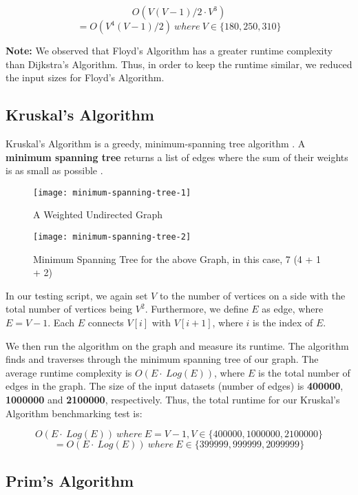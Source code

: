 \[ O(V(V-1)/2 \cdot V^3) \]
\[ =O(V^4(V-1)/2)\ where\ V \in \{180, 250, 310\}  \]

\textbf{Note:} We observed that Floyd's Algorithm has a greater runtime complexity than Dijkstra's Algorithm. Thus, in order to keep the runtime similar, we reduced the input sizes for Floyd's Algorithm.

\bigskip
\subsection{Kruskal's Algorithm}

Kruskal's Algorithm is a greedy, minimum-spanning tree algorithm \cite{exp60}. A \textbf{minimum spanning tree} returns a list of edges where the sum of their weights is as small as possible \cite{exp61}.

\begin{figure}[hp]
\centering
\texttt{[image: minimum-spanning-tree-1]}
\caption{\footnotesize{A Weighted Undirected Graph \cite{expa1}}}
\captionsetup{aboveskip=0pt,font=it}
\end{figure}
\bigskip

\begin{figure}[hp]
\centering
\texttt{[image: minimum-spanning-tree-2]}
\caption{\footnotesize{Minimum Spanning Tree for the above Graph, in this case, 7 (4 + 1 + 2) \cite{expa1}}}
\captionsetup{aboveskip=0pt,font=it}
\end{figure}
\bigskip

In our testing script, we again set \(V\) to the number of vertices on a side with the total number of vertices being \(V^2\). Furthermore, we define \(E\) as edge, where \(E = V - 1\). Each \(E\) connects \(V[i]\) with \(V[i+1]\), where \(i\) is the index of \(E\).

We then run the algorithm on the graph and measure its runtime. The algorithm finds and traverses through the minimum spanning tree of our graph. The average runtime complexity is \(O(E\cdot\ Log(E))\), where \(E\) is the total number of edges in the graph. The size of the input datasets (number of edges) is \textbf{400000}, \textbf{1000000} and \textbf{2100000}, respectively. Thus, the total runtime for our Kruskal's Algorithm benchmarking test is:

\[ O(E\cdot\ Log(E))\ where\ E = V - 1, V \in \{400000, 1000000, 2100000\} \]
\[ =O(E\cdot\ Log(E))\ where\ E \in \{399999, 999999, 2099999\} \]

\bigskip
\subsection{Prim's Algorithm}

